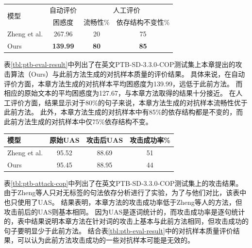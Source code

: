 \begin{table}[htbp]
    \vspace{0.5em}\centering\wuhao
	\begin{tabular}{lccc}
		\toprule[1.5pt]
		\multirow{2}{*}{模型}& 自动评价 & \multicolumn{2}{c}{人工评价} \\
		\cmidrule(r){2-2} \cmidrule(r){3-4}
		& 困惑度 &  流畅性\% & 依存结构不变性\%  \\
		\midrule[1pt]
		Zheng et al. & 267.96 & 20 & 75 \\
		Ours &\bf 139.99 &\bf 80 &\bf 85  \\
		\bottomrule[1.5pt]
	\end{tabular}
\end{table}

表\ref{tbl:ptb-eval-result}中列出了在英文PTB-SD-3.3.0-COP测试集上本章提出的攻击算法（Ours）与此前方法生成的对抗样本质量的评价结果。
具体来说，在自动评价方面，本章方法生成的对抗样本平均困惑度为139.99，远低于此前方法。
而相应的原始文本的平均困惑度为127.67，与本章方法取得的结果十分接近。
在人工评价方面，结果显示对于80\%的句子来说，本章方法生成的对抗样本流畅性优于此前方法。
此外，本章方法生成的对抗样本中有85\%的依存结构都是不变的，而此前方法生成的对抗样本中仅75\%依存结构不变。

\begin{table}[htbp]
    \vspace{0.5em}\centering\wuhao
	\begin{tabular}{lccc}
		\toprule[1.5pt]
		模型& 原始UAS & 攻击后UAS & 攻击成功率\% \\
		\midrule[1pt]
		Zheng et al. & 95.52 & 88.69 & 51 \\
		Ours & 95.45 & 88.95 &  44 \\
		\bottomrule[1.5pt]
	\end{tabular}
\end{table}

表\ref{tbl:ptb-attack-cop}中列出了在英文PTB-SD-3.3.0-COP测试集上的攻击结果。
由于Zheng等人只对无标签的句法依存分析进行了实验，为了与他们对比，该表中也只使用了UAS。
结果表明，本章方法的攻击成功率低于Zheng等人的方法，但攻击前后的UAS则基本相同。
因为UAS是逐词统计的，而攻击成功率是逐句统计的，表中结果说明本章方法在针对词的攻击上基本与此前方法相同，但攻击成功的句子要明显少于此前方法。
结合表\ref{tbl:ptb-eval-result}中的对抗样本质量评价结果，可以认为此前方法攻击成功的一些对抗样本可能是无效的。

